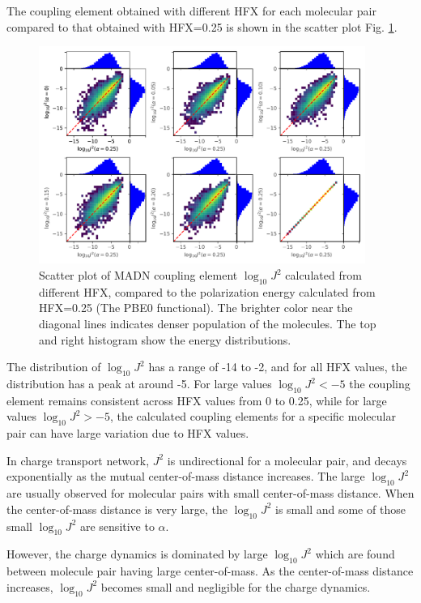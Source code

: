 \documentclass[letterpaper,12pt]{article}
\begin{document}
The coupling element obtained with different HFX for each molecular pair compared to that obtained with HFX=0.25 is shown in the scatter plot Fig. \ref{fig:J_MADN}.
\begin{figure}[H]
    \centering
    \includegraphics[width=0.95\textwidth]{figs/MADN_HFX/scatterJ_all.pdf}
    \caption{Scatter plot of MADN coupling element $\log_{10} J^2$ calculated from different HFX, compared to the polarization energy calculated from HFX=0.25 (The PBE0 functional). The brighter color near the diagonal lines indicates denser population of the molecules.  The top and right histogram show the energy distributions.}
    \label{fig:J_MADN}
\end{figure}

The distribution of $\log_{10} J^2$ has a range of -14 to -2, and for all HFX values, the distribution has a peak at around -5. 
For large values $\log_{10} J^2 < -5$ the coupling element remains consistent across HFX values from 0 to 0.25, while for large values $\log_{10} J^2 > -5$, the calculated coupling elements for a specific molecular pair can have large variation due to HFX values. 

In charge transport network, $J^2$ is undirectional for a molecular pair, and decays exponentially as the mutual center-of-mass distance increases. The large $\log_{10} J^2$ are usually observed for molecular pairs with small center-of-mass distance. 
When the center-of-mass distance is very large, the $\log_{10} J^2$ is small and some of those small $\log_{10} J^2$ are sensitive to $\alpha$. 

However, the charge dynamics is dominated by large $\log_{10} J^2$ which are found between molecule pair having large center-of-mass. As the center-of-mass distance increases, $\log_{10} J^2$ becomes small and negligible for the charge dynamics.
\end{document}
